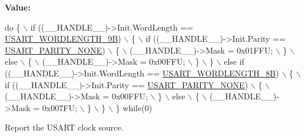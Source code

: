{\bfseries Value\+:}
\begin{DoxyCode}
\textcolor{keywordflow}{do} \{                                                                \(\backslash\)
  if ((\_\_HANDLE\_\_)->Init.WordLength == \hyperlink{group___u_s_a_r_t_ex___word___length_ga3a8363f7dccf85ccb52d698e0900f347}{USART\_WORDLENGTH\_9B})           \(\backslash\)
  \{                                                                   \(\backslash\)
     if ((\_\_HANDLE\_\_)->Init.Parity == \hyperlink{group___u_s_a_r_t___parity_ga85bfcbeb5ba1c34bbcda3f3e3b994846}{USART\_PARITY\_NONE})              \(\backslash\)
     \{                                                                \(\backslash\)
        (\_\_HANDLE\_\_)->Mask = 0x01FFU;                                 \(\backslash\)
     \}                                                                \(\backslash\)
     else                                                             \(\backslash\)
     \{                                                                \(\backslash\)
        (\_\_HANDLE\_\_)->Mask = 0x00FFU;                                 \(\backslash\)
     \}                                                                \(\backslash\)
  \}                                                                   \(\backslash\)
  else \textcolor{keywordflow}{if} ((\_\_HANDLE\_\_)->Init.WordLength == \hyperlink{group___u_s_a_r_t_ex___word___length_gae2978458689a31bed9a8a3e66ed84f50}{USART\_WORDLENGTH\_8B})      \(\backslash\)
  \{                                                                   \(\backslash\)
     if ((\_\_HANDLE\_\_)->Init.Parity == \hyperlink{group___u_s_a_r_t___parity_ga85bfcbeb5ba1c34bbcda3f3e3b994846}{USART\_PARITY\_NONE})              \(\backslash\)
     \{                                                                \(\backslash\)
        (\_\_HANDLE\_\_)->Mask = 0x00FFU;                                 \(\backslash\)
     \}                                                                \(\backslash\)
     else                                                             \(\backslash\)
     \{                                                                \(\backslash\)
        (\_\_HANDLE\_\_)->Mask = 0x007FU;                                 \(\backslash\)
     \}                                                                \(\backslash\)
  \}                                                                   \(\backslash\)
\} \textcolor{keywordflow}{while}(0)
\end{DoxyCode}


Report the U\+S\+A\+RT clock source. 


